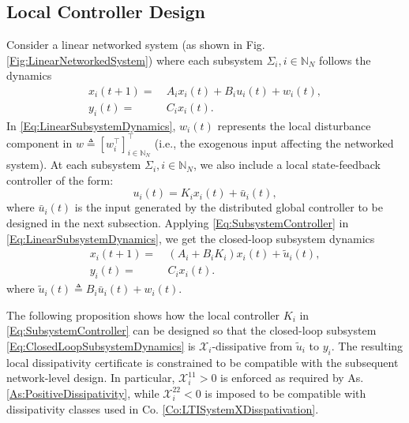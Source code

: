 \documentclass[letterpaper, 10 pt, conference]{ieeeconf}%
\newcommand{\N}{\mathbb{N}}
\newcommand{\T}{\top}
\newcommand{\0}{\mathbf{0}}
\newcommand{\X}{\mathcal{X}}
\begin{document}
\subsection{Local Controller Design}\label{SubSec:local_controller_design}
Consider a linear networked system (as shown in Fig. \ref{Fig:LinearNetworkedSystem}) where each subsystem $\Sigma_i, i\in\N_N$ follows the dynamics  
\begin{equation}\label{Eq:LinearSubsystemDynamics}
\begin{aligned}
x_i(t+1) =&\ A_ix_i(t) + B_iu_i(t) + w_i(t),\\
y_i(t) =&\ C_ix_i(t). 
\end{aligned}
\end{equation}
In \eqref{Eq:LinearSubsystemDynamics}, $w_i(t)$ represents the local disturbance component in $w \triangleq [w_i^\T]_{i\in\N_N}^\T$ (i.e., the exogenous input affecting the networked system). At each subsystem $\Sigma_i, i\in\N_N$, we also include a local state-feedback controller of the form: 
\begin{equation}\label{Eq:SubsystemController}
u_i(t) = K_ix_i(t) + \bar{u}_i(t),    
\end{equation}
where $\bar{u}_i(t)$ is the input generated by the distributed global controller to be designed in the next subsection. Applying \eqref{Eq:SubsystemController} in \eqref{Eq:LinearSubsystemDynamics}, we get the closed-loop subsystem dynamics
\begin{equation}\label{Eq:ClosedLoopSubsystemDynamics}
\begin{aligned}
x_i(t+1) =&\ (A_i+B_i K_i)x_i(t) + \tilde{u}_i(t),\\
y_i(t) =&\ C_ix_i(t). 
\end{aligned}
\end{equation}
where $\tilde{u}_i(t) \triangleq B_i \bar{u}_i(t) + w_i(t)$. 

The following proposition shows how the local controller $K_i$ in \eqref{Eq:SubsystemController} can be designed so that the closed-loop subsystem \eqref{Eq:ClosedLoopSubsystemDynamics} is $\X_i$-dissipative from $\tilde{u}_i$ to $y_i$. The resulting local dissipativity certificate is constrained to be compatible with the subsequent network-level design. In particular, $\X_i^{11}>0$ is enforced as required by As. \ref{As:PositiveDissipativity}, while $\X_i^{22}<0$ is imposed to be compatible with dissipativity classes used in Co. \ref{Co:LTISystemXDisspativation}.
\end{document}
